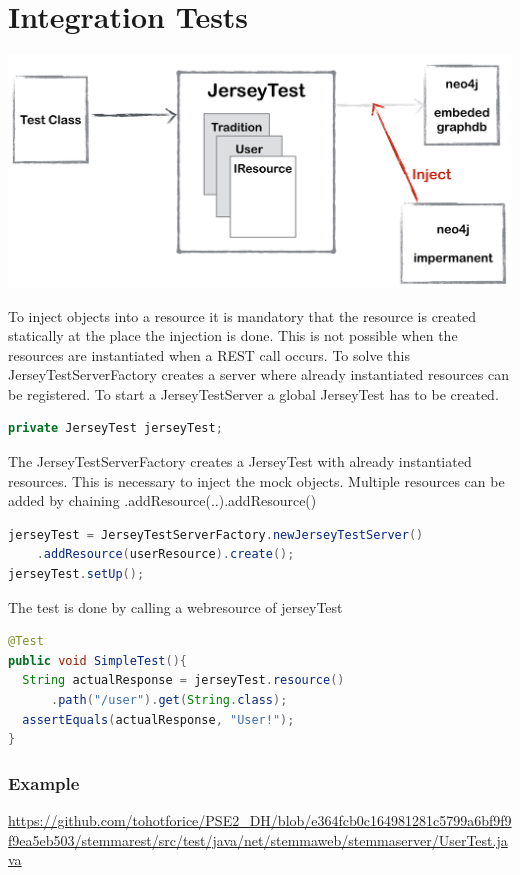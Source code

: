 \documentclass[11pt,fleqn,openany]{book} %
\begin{document}

\chapter{Integration Tests}

\begin{center}
\includegraphics[scale=.4]{Pictures/jerseytestoverview.png} 
\end{center}

To inject objects into a resource it is mandatory that the resource is created statically at the place the injection is done. This is not possible when the resources are instantiated when a REST call occurs. To solve this JerseyTestServerFactory creates a server where already instantiated resources can be registered. 
To start a JerseyTestServer a global JerseyTest has to be created.
\begin{lstlisting}[language=java]
private JerseyTest jerseyTest;
\end{lstlisting}
The JerseyTestServerFactory creates a JerseyTest with already instantiated resources. This is necessary to inject the mock objects. Multiple resources can be added by chaining .addResource(..).addResource()
\begin{lstlisting}[language=java]
jerseyTest = JerseyTestServerFactory.newJerseyTestServer()
	.addResource(userResource).create();
jerseyTest.setUp();
\end{lstlisting}

The test is done by calling a webresource of jerseyTest
\begin{lstlisting}[language=java]
@Test
public void SimpleTest(){
  String actualResponse = jerseyTest.resource()
      .path("/user").get(String.class);
  assertEquals(actualResponse, "User!");
}
\end{lstlisting}

\subsection*{Example}
\url{https://github.com/tohotforice/PSE2_DH/blob/e364fcb0c164981281c5799a6bf9f9f9ea5eb503/stemmarest/src/test/java/net/stemmaweb/stemmaserver/UserTest.java}
\end{document}
